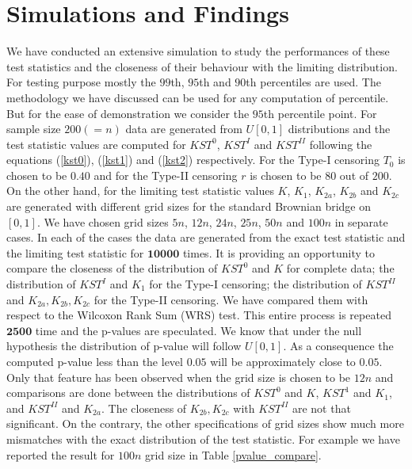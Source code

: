 \documentclass[12pt, reqno]{amsart}
\begin{document}
\section{Simulations and Findings}

We have conducted an extensive simulation  to study the performances of these test statistics and the closeness of  their behaviour  with the limiting distribution. For testing purpose mostly the $99$th, $95$th and $90$th  percentiles are used. The methodology we have discussed can be used for any computation of  percentile. But for the ease of demonstration we consider the $95$th percentile point. For sample size $200(=n)$ data are generated from $U[0,1]$ distributions and the test statistic values are computed for $KST^0$, $KST^I$ and $KST^{II}$ following the equations (\ref{kst0}), (\ref{kst1}) and (\ref{kst2}) respectively. For the Type-I censoring $T_0$ is chosen to be $0.40$ and for the Type-II censoring $r$ is chosen to be $80$ out of $200.$  On the other hand, for the limiting test statistic values  $K$, $K_1$, $K_{2a}$, $K_{2b}$ and $K_{2c}$ are  generated with different grid sizes for the standard Brownian bridge on $[0,1].$ We have chosen grid sizes $5n$, $12n$, $24n$, $25n$, $50n$ and $100n$ in separate cases. In each of the cases the data are generated from the exact test statistic and the limiting test statistic for $\mathbf{10000}$ times. It is providing  an opportunity to compare the closeness of the distribution of  $KST^0$ and $K$ for complete data; the distribution of $KST^I$ and $K_1$  for the Type-I censoring;  the distribution of $KST^{II}$ and $K_{2a}, K_{2b}, K_{2c}$  for the Type-II censoring. We have compared them with respect to the  Wilcoxon Rank Sum (WRS) test. This entire process is repeated $\mathbf{2500}$ time and the p-values are speculated.  We know that under the null hypothesis the distribution of p-value will follow $U[0,1]$. As a consequence the computed p-value less than  the level $0.05$ will be approximately close to $0.05$. Only that feature has been  observed when the grid size is chosen to be $12n$ and comparisons are done between the distributions of $KST^0$ and $K$, $KST^1$ and $K_1$,  and $KST^{II}$ and $K_{2a}$.  The closeness of $ K_{2b}, K_{2c}$ with $KST^{II}$ are not that significant. On the contrary, the other specifications of grid sizes  show  much more mismatches with the exact distribution of the test statistic. For example we have reported the result for  $100n$  grid size in Table \ref{pvalue_compare}.
\end{document}
